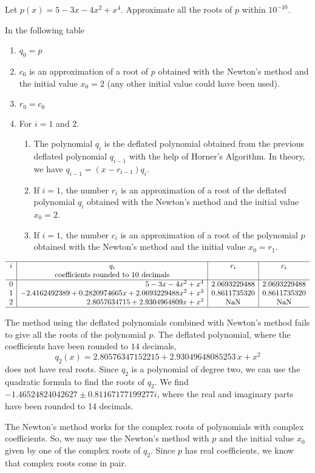 \begin{egg}
Let $p(x) = 5 -3x -4x^2+x^4$.  Approximate all the roots of $p$ within
$10^{-10}$.

In the following table
\begin{enumerate}
\item $q_0 = p$
\item $c_0$ is an approximation of a root of $p$ obtained with the
  Newton's method and the initial value $x_0 = 2$ (any other initial
  value could have been used).
\item $r_0 = c_0$
\item For $i=1$ and $2$.
{
\renewcommand{\labelenumii}{(\roman{enumii})}
\begin{enumerate}
\item The polynomial $q_i$ is the deflated polynomial obtained from
  the previous deflated polynomial $q_{i-1}$ with the help of Horner's
  Algorithm.  In theory, we have $q_{i-1} = (x-r_{i-1})q_i$.
\item If $i=1$, the number $r_i$ is an approximation of a root of the
  deflated polynomial $q_i$ obtained with the Newton's method
  and the initial value $x_0 = 2$.
\item If $i=1$, the number $c_i$ is an approximation of a root of the
  polynomial $p$ obtained with the Newton's method and the
  initial value $x_0 = r_1$.
\end{enumerate}
}
\end{enumerate}

\[
\begin{array}{c|r|c|c}
\hline
i & \multicolumn{1}{c|}{q_i} & r_i & c_i \\
& \multicolumn{1}{c|}{\text{coefficients rounded to 10 decimals}} & & \\
\hline
0 & 5 -3 x -4 x^2 +x^4 & 2.0693229488 & 2.0693229488 \\
1 & -2.4162492389 + 0.2820974665 x + 2.0693229488 x^2 +x^3 &
0.8611735320 & 0.8611735320 \\
2 & 2.8057634715 + 2.9304964809 x + x^2 & \text{NaN} & \text{NaN} \\
\hline
\end{array}
\]

The method using the deflated polynomials combined with Newton's method
fails to give all the roots of the polynomial $p$.  The
deflated polynomial, where the coefficients have been rounded to $14$
decimals,
\[
q_2(x) = 2.80576347152215 + 2.93049648085253 \, x + x^2
\]
does not have real roots.  Since $q_2$ is a polynomial of degree two,
we can use the quadratic formula to find the roots of $q_2$.  We find
$-1.46524824042627 \pm 0.81167177199277i$, where the real and
imaginary parts have been rounded to 14 decimals.

The Newton's method works for the complex roots of
polynomials with complex coefficients.  So, we may use the
Newton's method with $p$ and the initial value $x_0$ given by one of the
complex roots of $q_2$.  Since $p$ has real coefficients, we know that
complex roots come in pair.
\end{egg}

